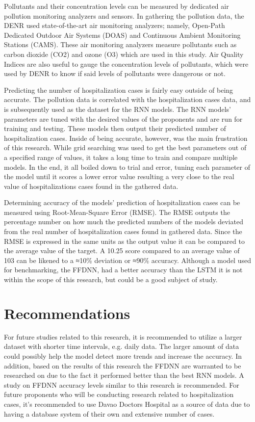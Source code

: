 \documentclass[10pt,11pt,12pt,oneside]{book}
\begin{document}
Pollutants and their concentration levels can be measured by dedicated air pollution monitoring analyzers and sensors. In gathering the pollution data, the DENR used state-of-the-art air monitoring analyzers; namely, Open-Path Dedicated Outdoor Air Systems (DOAS) and Continuous Ambient Monitoring Stations (CAMS). These air monitoring analyzers measure pollutants such as carbon dioxide (CO2) and ozone (O3) which are used in this study. Air Quality Indices are also useful to gauge the concentration levels of pollutants, which were used by DENR to know if said levels of pollutants were dangerous or not.

Predicting the number of hospitalization cases is fairly easy outside of being accurate. The pollution data is correlated with the hospitalization cases data, and is subsequently used as the dataset for the RNN models. The RNN models' parameters are tuned with the desired values of the proponents and are run for training and testing. These models then output their predicted number of hospitalization cases. Inside of being accurate, however, was the main frustration of this research. While grid searching was used to get the best parameters out of a specified range of values, it takes a long time to train and compare multiple models. In the end, it all boiled down to trial and error, tuning each parameter of the model until it scores a lower error value resulting a very close to the real value of hospitalizations cases found in the gathered data. 

Determining accuracy of the models' prediction of hospitalization cases can be measured using Root-Mean-Square Error (RMSE). The RMSE outputs the percentage number on how much the predicted numbers of the models deviated from the real number of hospitalization cases found in gathered data. Since the RMSE is expressed in the same units as the output value it can be compared to the average value of the target. A 10.25 score compared to an average value of 103 can be likened to a ≈10\% deviation or ≈90\% accuracy. Although a model used for benchmarking, the FFDNN, had a better accuracy than the LSTM it is not within the scope of this research, but could be a good subject of study.


\section{Recommendations}
For future studies related to this research, it is recommended to utilize a larger dataset with shorter time intervals, e.g. daily data. The larger amount of data could possibly help the model detect more trends and increase the accuracy. 
In addition, based on the results of this research the FFDNN are warranted to be researched on due to the fact it performed better than the best RNN models. A study on FFDNN accuracy levels similar to this research is recommended.
For future proponents who will be conducting research related to hospitalization cases, it's recommended to use Davao Doctors Hospital as a source of data due to having a database system of their own and extensive number of cases.
    
    
\end{document}
